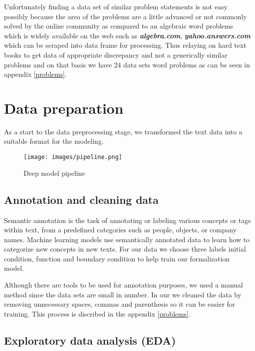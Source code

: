 \newpage
Unfortunately finding a data set of similar problem statements is not easy possibly because the area of the problems are a little advanced or not commonly solved by the online community as compared to an algebraic word problems which is widely available on the web such as \textbf{\textit{algebra.com}}, \textbf{\textit{yahoo.answers.com}} which can be scraped into data frame for processing. Thus relaying on hard text books to get data of appropriate discrepancy and not a generically similar problems and on that basis we have 24 data sets word problems as can be seen in appendix \ref{problems}. 

\section{Data preparation} 
 As a start to the data preprocessing stage, we transformed the text data into a suitable format for the modeling. 
 \begin{figure}[bht]
    \centering
    \texttt{[image: images/pipeline.png]}
    \caption{Deep model pipeline}
    \label{fig:4 complete model procesies}
\end{figure}
\subsection{Annotation and cleaning data} 
Semantic annotation is the task of annotating or labeling various concepts or tags within text, from a predefined categories such as people, objects, or company names. Machine learning models use semantically annotated data to learn how to categorize new concepts in new texts. 
For our data we choose three labels initial condition, function and boundary condition to help train our formalization model. 

Although there are tools to be used for annotation purposes, we used a manual method since the data sets are small in number. In our we cleaned the data by removing unnecessary spaces, commas and parenthesis so it can be easier for training. This process is discribed in the appendix \ref{problems}.                                   
\subsection{Exploratory data analysis (EDA)}
